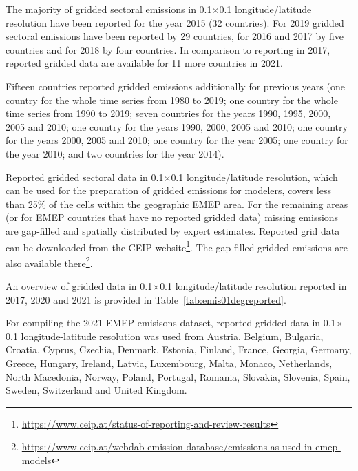 The majority of gridded sectoral emissions in 0.1{\degrees}$\times$0.1{\degrees} lon\-gi\-tude/la\-ti\-tude resolution have been reported for the year 2015 (32 countries). For 2019 gridded sectoral emissions have been reported by 29 countries, for 2016 and 2017 by five countries and for 2018 by four countries. In comparison to reporting in 2017, reported gridded data are available for 11 more countries in 2021.

Fifteen countries reported gridded emissions additionally for previous years (one country for the whole time series from 1980 to 2019; one country for the whole time series from 1990 to 2019; seven countries for the years 1990, 1995, 2000, 2005 and 2010; one country for the years 1990, 2000, 2005 and 2010; one country for the years 2000, 2005 and 2010; one country for the year 2005; one country for the year 2010; and two countries for the year 2014).


Reported gridded sectoral data in 0.1{\degrees}$\times$0.1{{\degrees}} lon\-gi\-tude/la\-ti\-tude resolution, which can be used for the preparation of gridded emissions for modelers, covers less than 25\% of the cells within the geographic EMEP area. For the remaining areas (or for EMEP countries that have no reported gridded data) missing emissions are gap-filled and spatially distributed by expert estimates. Reported grid data can be downloaded from the CEIP website\footnote{\url{https://www.ceip.at/status-of-reporting-and-review-results}}. The gap-filled gridded emissions are also available there\footnote{\url{https://www.ceip.at/webdab-emission-database/emissions-as-used-in-emep-models}}. 

An overview of gridded data in 0.1{\degrees}$\times$0.1{{\degrees}} lon\-gi\-tude/la\-ti\-tude resolution reported in 2017, 2020 and 2021 is provided in Table~\ref{tab:emis01degreported}.





For compiling the 2021 EMEP emisisons dataset, reported gridded data in 0.1{\degrees}$\times$0.1{\degrees} longitude-latitude resolution was used from Austria, Belgium, Bulgaria, Croatia, Cyprus, Czechia, Denmark, Estonia, Finland, France, Georgia, Germany, Greece, Hungary, Ireland, Latvia, Luxembourg, Malta, Monaco, Netherlands, North Macedonia, Norway, Poland, Portugal, Romania, Slovakia, Slovenia, Spain, Sweden, Switzerland and United Kingdom.



